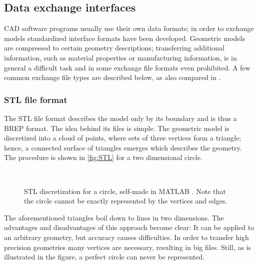 \subsection{Data exchange interfaces}
\ac{CAD} software programs usually use their own data formats; in order to exchange models standardized interface formats have been developed. Geometric models are compressed to certain geometry descriptions; transferring additional information, such as material properties or manufacturing information, is in general a difficult task and in some exchange file formats even prohibited. A few common exchange file types are described below, as also compared in \cite{STL}.
\subsubsection{\acs{STL} file format} \label{subsub:STL}
The \acf{STL} file format describes the model only by its boundary and is thus a \ac{BREP} format. The idea behind its files is simple. The geometric model is discretized into a cloud of points, where sets of three vertices form a triangle; hence, a connected surface of triangles emerges which describes the geometry. The procedure is shown in \autoref{fig:STL} for a two dimensional circle.  
\begin{figure}
\centering
   \\
   \caption{\ac{STL} discretization for a circle, self-made in MATLAB \cite{MATLAB}. Note that the circle cannot be exactly represented by the vertices and edges.}
   \label{fig:STL}
\end{figure}
The aforementioned triangles boil down to lines in two dimensions. The advantages and disadvantages of this approach become clear: It can be applied to an arbitrary geometry, but accuracy causes difficulties. In order to transfer high precision geometries many vertices are necessary, resulting in big files. Still, as is illustrated in the figure, a perfect circle can never be represented. 

